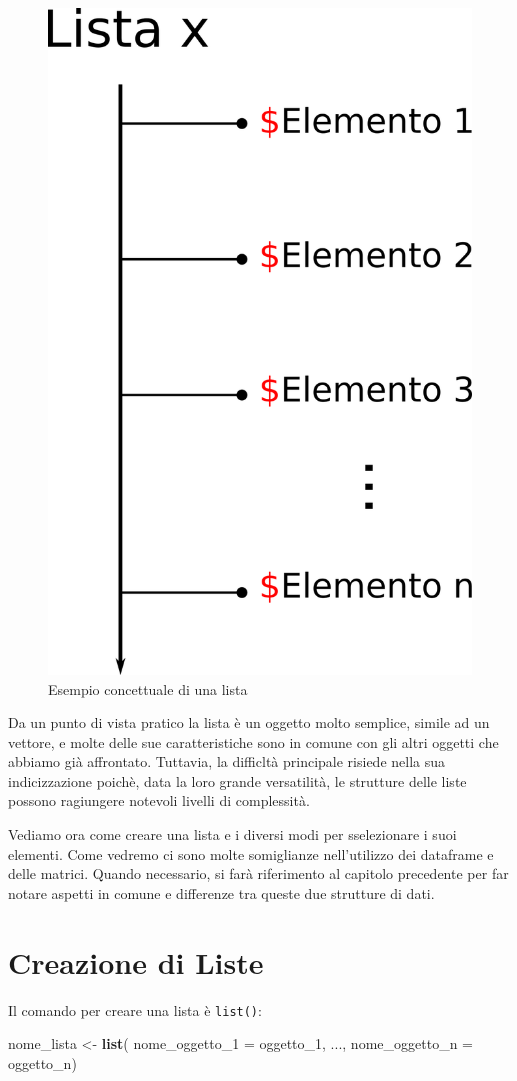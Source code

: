 \documentclass[
]{book}
\newenvironment{Shaded}{\begin{snugshade}}{\end{snugshade}}
\newcommand{\DataTypeTok}[1]{\textcolor[rgb]{0.13,0.29,0.53}{#1}}
\newcommand{\DecValTok}[1]{\textcolor[rgb]{0.00,0.00,0.81}{#1}}
\newcommand{\KeywordTok}[1]{\textcolor[rgb]{0.13,0.29,0.53}{\textbf{#1}}}
\newcommand{\NormalTok}[1]{#1}
\newcommand{\StringTok}[1]{\textcolor[rgb]{0.31,0.60,0.02}{#1}}
\begin{document}
\begin{figure}

{\centering \includegraphics[width=0.3\linewidth,height=0.3\textheight]{images/list_example} 

}

\caption{Esempio concettuale di una lista}\label{fig:list-example}
\end{figure}

Da un punto di vista pratico la lista è un oggetto molto semplice, simile ad un vettore, e molte delle sue caratteristiche sono in comune con gli altri oggetti che abbiamo già affrontato. Tuttavia, la difficltà principale risiede nella sua indicizzazione poichè, data la loro grande versatilità, le strutture delle liste possono ragiungere notevoli livelli di complessità.

Vediamo ora come creare una lista e i diversi modi per sselezionare i suoi elementi. Come vedremo ci sono molte somiglianze nell'utilizzo dei dataframe e delle matrici. Quando necessario, si farà riferimento al capitolo precedente per far notare aspetti in comune e differenze tra queste due strutture di dati.

\hypertarget{creazione-di-liste}{%
\section{Creazione di Liste}\label{creazione-di-liste}}

Il comando per creare una lista è \texttt{list()}:

\begin{Shaded}
\begin{Highlighting}[]
\NormalTok{nome_lista <-}\StringTok{ }\KeywordTok{list}\NormalTok{(}
  \DataTypeTok{nome_oggetto_1 =}\NormalTok{ oggetto_}\DecValTok{1}\NormalTok{,}
\NormalTok{  ...,}
  \DataTypeTok{nome_oggetto_n =}\NormalTok{ oggetto_n)}
\end{Highlighting}
\end{Shaded}
\end{document}
